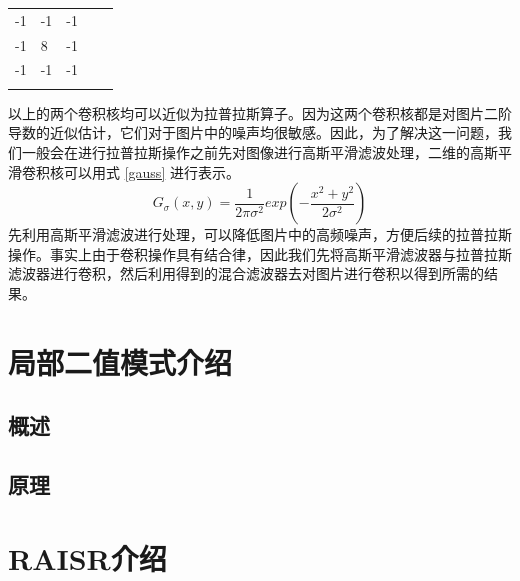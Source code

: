 \documentclass[12pt, a4paper, oneside]{ctexbook}
\begin{document}
	\begin{table}[h]
		\centering
		\begin{tabular}{lllll}
			\cline{1-3}
			\multicolumn{1}{|l|}{-1} & \multicolumn{1}{l|}{-1} & \multicolumn{1}{l|}{-1} &  &  \\ \cline{1-3}
			\multicolumn{1}{|l|}{-1} & \multicolumn{1}{l|}{8}  & \multicolumn{1}{l|}{-1} &  &  \\ \cline{1-3}
			\multicolumn{1}{|l|}{-1} & \multicolumn{1}{l|}{-1} & \multicolumn{1}{l|}{-1} &  &  \\ \cline{1-3}
			&                         &                         &  & 
		\end{tabular}
	\end{table}
	以上的两个卷积核均可以近似为拉普拉斯算子。因为这两个卷积核都是对图片二阶导数的近似估计，它们对于图片中的噪声均很敏感。因此，为了解决这一问题，我们一般会在进行拉普拉斯操作之前先对图像进行高斯平滑滤波处理，二维的高斯平滑卷积核可以用式 \ref{gauss} 进行表示。
	\begin{equation}	\label{gauss}
		G_\sigma (x,y)=\frac{1}{2\pi \sigma ^2} exp(-\frac{x^2+y^2}{2\sigma ^2}) 
	\end{equation}
	先利用高斯平滑滤波进行处理，可以降低图片中的高频噪声，方便后续的拉普拉斯操作。事实上由于卷积操作具有结合律，因此我们先将高斯平滑滤波器与拉普拉斯滤波器进行卷积，然后利用得到的混合滤波器去对图片进行卷积以得到所需的结果。
	
	\section{局部二值模式介绍}
		\subsection{概述}

		\subsection{原理}
	
	\section{RAISR介绍}
\end{document}
